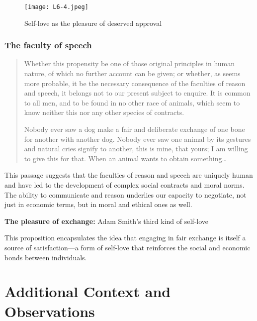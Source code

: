             \begin{figure}[h]
                \centering
                \texttt{[image: L6-4.jpeg]}
                \caption{Self-love as the pleasure of  deserved approval}
                \label{fig:enter-label}
            \end{figure}

        \subsubsection{The faculty of speech}

            \begin{quote}
                Whether this propensity be one of those original principles in human nature, of which no further account can be given; or whether, as seems more probable, it be the necessary consequence of the faculties of reason and speech, it belongs not to our present subject to enquire. It is common to all men, and to be found in no other race of animals, which seem to know neither this nor any other species of contracts.
                
                Nobody ever saw a dog make a fair and deliberate exchange of one bone for another with another dog. Nobody ever saw one animal by its gestures and natural cries signify to another, this is mine, that yours; I am willing to give this for that. When an animal wants to obtain something…
            \end{quote}

             This passage suggests that the faculties of reason and speech are uniquely human and have led to the development of complex social contracts and moral norms. The ability to communicate and reason underlies our capacity to negotiate, not just in economic terms, but in moral and ethical ones as well.

            \begin{proposition}
                \textbf{The pleasure of exchange:} Adam Smith’s third kind of self-love
            \end{proposition}

            This proposition encapsulates the idea that engaging in fair exchange is itself a source of satisfaction—a form of self-love that reinforces the social and economic bonds between individuals.

\section*{Additional Context and Observations}

